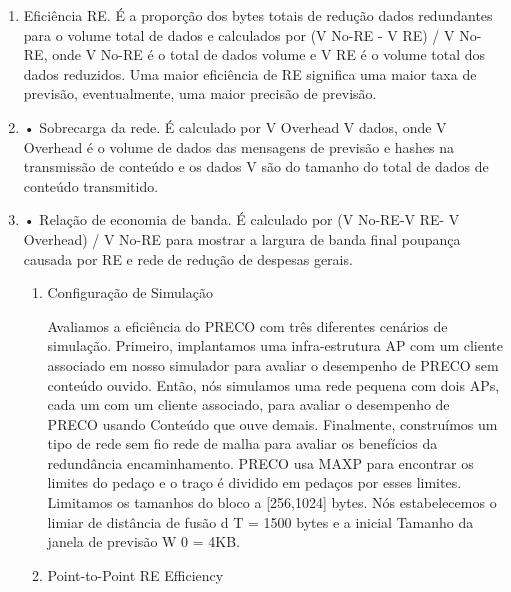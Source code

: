 \documentclass[12pt]{article}
\begin{document}
\begin{enumerate}
	
	\item Eficiência RE. 
	É a proporção dos bytes totais de redução
	dados redundantes para o volume total de dados e calculados por
	(V No-RE - V RE) / V No-RE, onde V No-RE é o total de dados
	volume e V RE é o volume total dos dados reduzidos.
	Uma maior eficiência de RE significa uma maior taxa de previsão,
	eventualmente, uma maior precisão de previsão.
	
	\item • Sobrecarga da rede.
	 É calculado por V Overhead
	V dados, onde
	V Overhead é o volume de dados das mensagens de previsão e
	hashes na transmissão de conteúdo e os dados V são do tamanho do
	total de dados de conteúdo transmitido.
	\item • Relação de economia de banda.
	 É calculado por (V No-RE-V RE-
	V Overhead) / V No-RE para mostrar a largura de banda final
	poupança causada por RE e rede de redução de despesas gerais.
	
	\begin{enumerate}
		\item Configuração de Simulação
		
		Avaliamos a eficiência do PRECO com três diferentes
		cenários de simulação. Primeiro, implantamos uma infra-estrutura AP
		com um cliente associado em nosso simulador para avaliar o
		desempenho de PRECO sem conteúdo ouvido. Então,
		nós simulamos uma rede pequena com dois APs, cada um com um
		cliente associado, para avaliar o desempenho de PRECO usando
		Conteúdo que ouve demais. Finalmente, construímos um tipo de rede sem fio
		rede de malha para avaliar os benefícios da redundância
		encaminhamento. PRECO usa MAXP para encontrar os limites do pedaço
		e o traço é dividido em pedaços por esses limites.
		Limitamos os tamanhos do bloco a [256,1024] bytes. Nós estabelecemos o
		limiar de distância de fusão d T = 1500 bytes e a inicial
		Tamanho da janela de previsão W 0 = 4KB.
		
		\item Point-to-Point RE Efficiency
		

\end{enumerate}
\end{enumerate}
\end{document}
